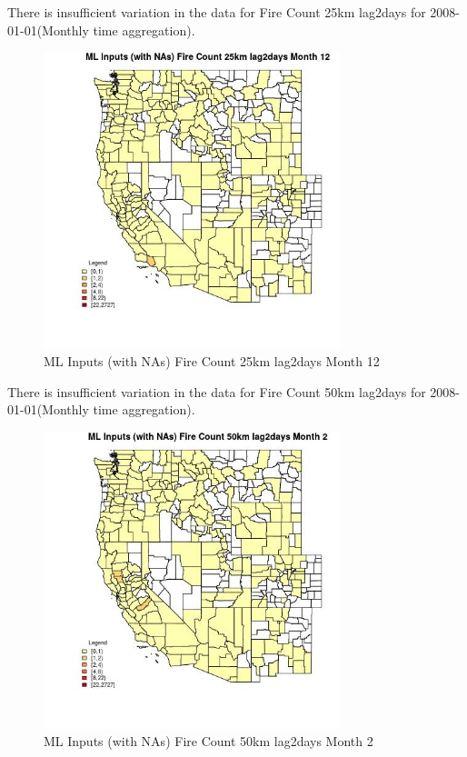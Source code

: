 There is insufficient variation in the data for Fire Count 25km lag2days for 2008-01-01(Monthly time aggregation). 
 

\begin{figure} 
\centering  
\includegraphics[width=0.77\textwidth]{Code_Outputs/Report_ML_input_PM25_Step4_part_f_de_duplicated_aves_prioritize_24hr_obswNAs_CountyFire_Count_25km_lag2daysmedianMonth12.jpg} 
\caption{\label{fig:Report_ML_input_PM25_Step4_part_f_de_duplicated_aves_prioritize_24hr_obswNAsCountyFire_Count_25km_lag2daysmedianMonth12}ML Inputs (with NAs) Fire Count 25km lag2days Month 12} 
\end{figure} 
 

There is insufficient variation in the data for Fire Count 50km lag2days for 2008-01-01(Monthly time aggregation). 
 

\begin{figure} 
\centering  
\includegraphics[width=0.77\textwidth]{Code_Outputs/Report_ML_input_PM25_Step4_part_f_de_duplicated_aves_prioritize_24hr_obswNAs_CountyFire_Count_50km_lag2daysmedianMonth2.jpg} 
\caption{\label{fig:Report_ML_input_PM25_Step4_part_f_de_duplicated_aves_prioritize_24hr_obswNAsCountyFire_Count_50km_lag2daysmedianMonth2}ML Inputs (with NAs) Fire Count 50km lag2days Month 2} 
\end{figure} 
 

